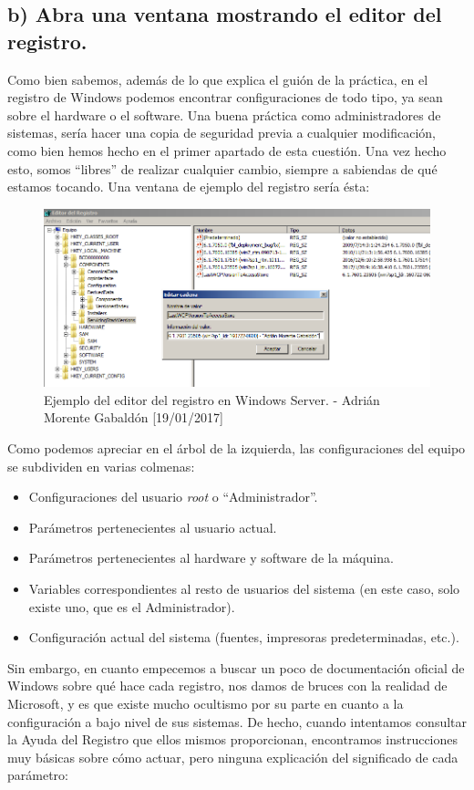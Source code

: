 	\subsection{b) Abra una ventana mostrando el editor del registro.}
	Como bien sabemos, además de lo que explica el guión de la práctica, en el registro de Windows podemos encontrar configuraciones de todo tipo, ya sean sobre el hardware o el software. Una buena práctica como administradores de sistemas, sería hacer una copia de seguridad previa a cualquier modificación, como bien hemos hecho en el primer apartado de esta cuestión. Una vez hecho esto, somos ``libres'' de realizar cualquier cambio, siempre a sabiendas de qué estamos tocando. Una ventana de ejemplo del registro sería ésta:
	\begin{figure}[H]
		\centering
		\includegraphics[scale=0.45]{regedit-example}
		\caption{Ejemplo del editor del registro en Windows Server. - Adrián Morente Gabaldón [19/01/2017]}
		\label{figura11}
	\end{figure}
	Como podemos apreciar en el árbol de la izquierda, las configuraciones del equipo se subdividen en varias colmenas:
	\begin{itemize}
		\item Configuraciones del usuario \emph{root} o ``Administrador''.
		\item Parámetros pertenecientes al usuario actual.
		\item Parámetros pertenecientes al hardware y software de la máquina.
		\item Variables correspondientes al resto de usuarios del sistema (en este caso, solo existe uno, que es el Administrador).
		\item Configuración actual del sistema (fuentes, impresoras predeterminadas, etc.).
	\end{itemize}
	Sin embargo, en cuanto empecemos a buscar un poco de documentación oficial de Windows sobre qué hace cada registro, nos damos de bruces con la realidad de Microsoft, y es que existe mucho ocultismo por su parte en cuanto a la configuración a bajo nivel de sus sistemas. De hecho, cuando intentamos consultar la Ayuda del Registro que ellos mismos proporcionan, encontramos instrucciones muy básicas sobre cómo actuar, pero ninguna explicación del significado de cada parámetro:
